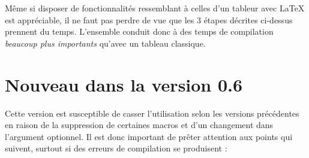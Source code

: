 \documentclass[french,a4paper,10pt]{article}
\newcommand*\NEW{\marginpar{\vspace{-1.5ex}\itshape\color{red}New v\STver}}
\begin{document}
Même si disposer de fonctionnalités ressemblant à celles d'un tableur avec \LaTeX{} est appréciable, il ne faut pas perdre de vue que les 3 étapes décrites ci-dessus prennent du temps. L'ensemble conduit donc à des temps de compilation \emph{beaucoup plus importants} qu'avec un tableau classique.

\section{Nouveau dans la version 0.6}
Cette version\NEW{} est susceptible de casser l'utilisation selon les versions précédentes en raison de la suppression de certaines macros et d'un changement dans l'argument optionnel. Il est donc important de prêter attention aux points qui suivent, surtout si des erreurs de compilation se produisent :
\end{document}
